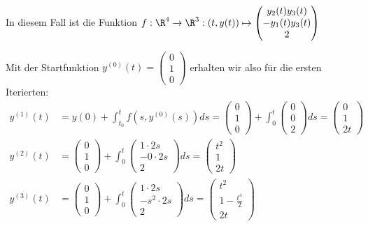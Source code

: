 \begin{exercise}

\end{exercise}

\begin{solution}

In diesem Fall ist die Funktion $f:\R^{4} \to \R^{3}:(t,y(t))\mapsto \begin{pmatrix}
     y_{2}(t)y_{3}(t)  \\
     -y_{1}(t)y_{3}(t) \\
     2
\end{pmatrix}$

Mit der Startfunktion $y^{(0)}(t) = \begin{pmatrix}
0 \\ 1 \\ 0
\end{pmatrix}$ erhalten wir also für die ersten Iterierten:
\begin{align}
    y^{(1)}(t) &= y(0) + \int_{t_{0}}^{t}f(s,y^{(0)}(s))ds = \begin{pmatrix}
        0 \\ 1 \\ 0
    \end{pmatrix} + \int_{0}^{t}
    \begin{pmatrix}
        0 \\ 0 \\ 2
    \end{pmatrix} ds =
    \begin{pmatrix}
        0 \\ 1 \\ 2t
    \end{pmatrix} \\
    y^{(2)}(t) &=
    \begin{pmatrix}
        0 \\ 1 \\ 0
    \end{pmatrix} + \int_{0}^{t}
    \begin{pmatrix}
        1\cdot 2s \\ -0 \cdot 2s \\ 2
    \end{pmatrix} ds =
    \begin{pmatrix}
        t^{2} \\ 1 \\ 2t
    \end{pmatrix} \\
    y^{(3)}(t) &=
    \begin{pmatrix}
        0 \\ 1 \\ 0
    \end{pmatrix} + \int_{0}^{t}
    \begin{pmatrix}
        1 \cdot 2s \\ -s^{2}\cdot 2s \\ 2
    \end{pmatrix} ds =
    \begin{pmatrix}
        t^{2} \\ 1-\frac{t^{4}}{2} \\ 2t
    \end{pmatrix}
\end{align}


\end{solution}
